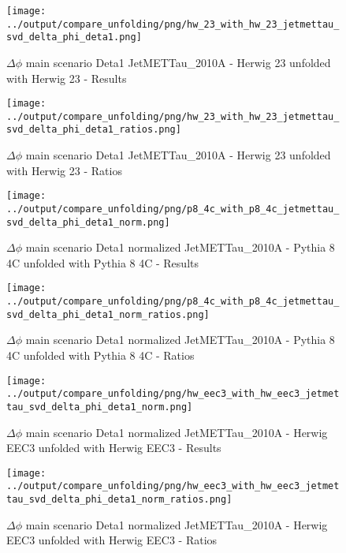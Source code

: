 \documentclass[11pt]{book}
\begin{document}
\begin{figure}[ht]
\centering
\texttt{[image: ../output/compare\_unfolding/png/hw\_23\_with\_hw\_23\_jetmettau\_svd\_delta\_phi\_deta1.png]}
\caption{$\Delta\phi$ main scenario Deta1 JetMETTau\_2010A - Herwig 23 unfolded with Herwig 23 - Results}
\label{hw_23_hw_23_jetmettau_svd_delta_phi_deta1_a}
\end{figure}

\begin{figure}[ht]
\centering
\texttt{[image: ../output/compare\_unfolding/png/hw\_23\_with\_hw\_23\_jetmettau\_svd\_delta\_phi\_deta1\_ratios.png]}
\caption{$\Delta\phi$ main scenario Deta1 JetMETTau\_2010A - Herwig 23 unfolded with Herwig 23 - Ratios}
\label{hw_23_hw_23_jetmettau_svd_delta_phi_deta1_b}
\end{figure}


\begin{figure}[ht]
\centering
\texttt{[image: ../output/compare\_unfolding/png/p8\_4c\_with\_p8\_4c\_jetmettau\_svd\_delta\_phi\_deta1\_norm.png]}
\caption{$\Delta\phi$ main scenario Deta1 normalized JetMETTau\_2010A - Pythia 8 4C unfolded with Pythia 8 4C - Results}
\label{p8_p8_jetmettau_svd_delta_phi_deta1_norm_a}
\end{figure}

\begin{figure}[ht]
\centering
\texttt{[image: ../output/compare\_unfolding/png/p8\_4c\_with\_p8\_4c\_jetmettau\_svd\_delta\_phi\_deta1\_norm\_ratios.png]}
\caption{$\Delta\phi$ main scenario Deta1 normalized JetMETTau\_2010A - Pythia 8 4C unfolded with Pythia 8 4C - Ratios}
\label{p8_p8_jetmettau_svd_delta_phi_deta1_norm_b}
\end{figure}

\begin{figure}[ht]
\centering
\texttt{[image: ../output/compare\_unfolding/png/hw\_eec3\_with\_hw\_eec3\_jetmettau\_svd\_delta\_phi\_deta1\_norm.png]}
\caption{$\Delta\phi$ main scenario Deta1 normalized JetMETTau\_2010A - Herwig EEC3 unfolded with Herwig EEC3 - Results}
\label{hw_eec3_hw_eec3_jetmettau_svd_delta_phi_deta1_norm_a}
\end{figure}

\begin{figure}[ht]
\centering
\texttt{[image: ../output/compare\_unfolding/png/hw\_eec3\_with\_hw\_eec3\_jetmettau\_svd\_delta\_phi\_deta1\_norm\_ratios.png]}
\caption{$\Delta\phi$ main scenario Deta1 normalized JetMETTau\_2010A - Herwig EEC3 unfolded with Herwig EEC3 - Ratios}
\label{hw_eec3_hw_eec3_jetmettau_svd_delta_phi_deta1_norm_b}
\end{figure}
\end{document}
